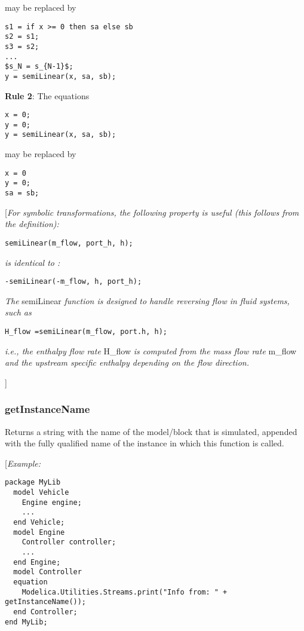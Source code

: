 may be replaced by
\begin{lstlisting}[language=modelica, mathescape=true]
s1 = if x >= 0 then sa else sb
s2 = s1;
s3 = s2;
...
$s_N = s_{N-1}$;
y = semiLinear(x, sa, sb);
\end{lstlisting}

\textbf{Rule 2}: The equations
\begin{lstlisting}[language=modelica]
x = 0;
y = 0;
y = semiLinear(x, sa, sb);
\end{lstlisting}

may be replaced by
\begin{lstlisting}[language=modelica]
x = 0
y = 0;
sa = sb;
\end{lstlisting}

{[}\emph{For symbolic transformations, the following property is useful
(this follows from the definition):}
\begin{lstlisting}[language=modelica]
semiLinear(m_flow, port_h, h);
\end{lstlisting}
\emph{is identical to :}
\begin{lstlisting}[language=modelica]
-semiLinear(-m_flow, h, port_h);
\end{lstlisting}

\emph{The} semiLinear \emph{function is designed to handle reversing
flow in fluid systems, such as}
\begin{lstlisting}[language=modelica]
H_flow =semiLinear(m_flow, port.h, h);
\end{lstlisting}

\emph{i.e., the enthalpy flow rate} H\_flow \emph{is computed from the
mass flow rate} m\_flow \emph{and the upstream specific enthalpy
depending on the flow direction. }

{]}

\subsubsection{getInstanceName}

Returns a string with the name of the model/block that is simulated,
appended with the fully qualified name of the instance in which this
function is called.

{[}\emph{Example:}
\begin{lstlisting}[language=modelica]
package MyLib
  model Vehicle
    Engine engine;
    ...
  end Vehicle;
  model Engine
    Controller controller;
    ...
  end Engine;
  model Controller
  equation
    Modelica.Utilities.Streams.print("Info from: " + getInstanceName());
  end Controller;
end MyLib;
\end{lstlisting}

